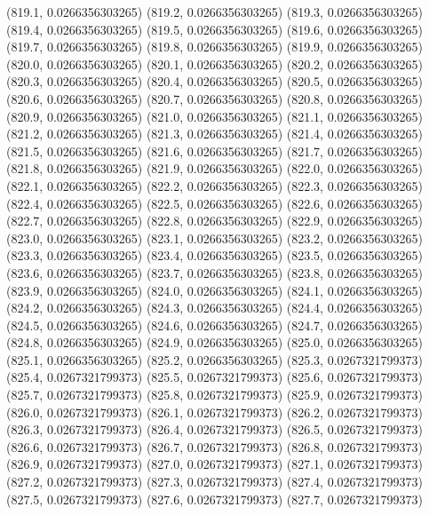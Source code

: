 {					(819.1, 0.0266356303265)
					(819.2, 0.0266356303265)
					(819.3, 0.0266356303265)
					(819.4, 0.0266356303265)
					(819.5, 0.0266356303265)
					(819.6, 0.0266356303265)
					(819.7, 0.0266356303265)
					(819.8, 0.0266356303265)
					(819.9, 0.0266356303265)
					(820.0, 0.0266356303265)
					(820.1, 0.0266356303265)
					(820.2, 0.0266356303265)
					(820.3, 0.0266356303265)
					(820.4, 0.0266356303265)
					(820.5, 0.0266356303265)
					(820.6, 0.0266356303265)
					(820.7, 0.0266356303265)
					(820.8, 0.0266356303265)
					(820.9, 0.0266356303265)
					(821.0, 0.0266356303265)
					(821.1, 0.0266356303265)
					(821.2, 0.0266356303265)
					(821.3, 0.0266356303265)
					(821.4, 0.0266356303265)
					(821.5, 0.0266356303265)
					(821.6, 0.0266356303265)
					(821.7, 0.0266356303265)
					(821.8, 0.0266356303265)
					(821.9, 0.0266356303265)
					(822.0, 0.0266356303265)
					(822.1, 0.0266356303265)
					(822.2, 0.0266356303265)
					(822.3, 0.0266356303265)
					(822.4, 0.0266356303265)
					(822.5, 0.0266356303265)
					(822.6, 0.0266356303265)
					(822.7, 0.0266356303265)
					(822.8, 0.0266356303265)
					(822.9, 0.0266356303265)
					(823.0, 0.0266356303265)
					(823.1, 0.0266356303265)
					(823.2, 0.0266356303265)
					(823.3, 0.0266356303265)
					(823.4, 0.0266356303265)
					(823.5, 0.0266356303265)
					(823.6, 0.0266356303265)
					(823.7, 0.0266356303265)
					(823.8, 0.0266356303265)
					(823.9, 0.0266356303265)
					(824.0, 0.0266356303265)
					(824.1, 0.0266356303265)
					(824.2, 0.0266356303265)
					(824.3, 0.0266356303265)
					(824.4, 0.0266356303265)
					(824.5, 0.0266356303265)
					(824.6, 0.0266356303265)
					(824.7, 0.0266356303265)
					(824.8, 0.0266356303265)
					(824.9, 0.0266356303265)
					(825.0, 0.0266356303265)
					(825.1, 0.0266356303265)
					(825.2, 0.0266356303265)
					(825.3, 0.0267321799373)
					(825.4, 0.0267321799373)
					(825.5, 0.0267321799373)
					(825.6, 0.0267321799373)
					(825.7, 0.0267321799373)
					(825.8, 0.0267321799373)
					(825.9, 0.0267321799373)
					(826.0, 0.0267321799373)
					(826.1, 0.0267321799373)
					(826.2, 0.0267321799373)
					(826.3, 0.0267321799373)
					(826.4, 0.0267321799373)
					(826.5, 0.0267321799373)
					(826.6, 0.0267321799373)
					(826.7, 0.0267321799373)
					(826.8, 0.0267321799373)
					(826.9, 0.0267321799373)
					(827.0, 0.0267321799373)
					(827.1, 0.0267321799373)
					(827.2, 0.0267321799373)
					(827.3, 0.0267321799373)
					(827.4, 0.0267321799373)
					(827.5, 0.0267321799373)
					(827.6, 0.0267321799373)
					(827.7, 0.0267321799373)
}
